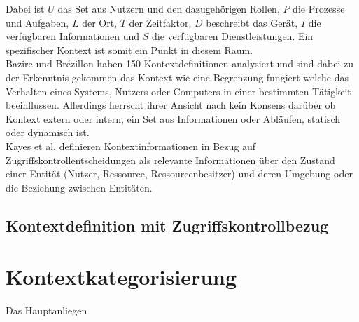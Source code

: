 Dabei ist $U$ das Set aus Nutzern und den dazugehörigen Rollen, $P$ die Prozesse und Aufgaben, $L$ der Ort, $T$ der Zeitfaktor, $D$ beschreibt das Gerät, $I$ die verfügbaren Informationen und $S$ die verfügbaren Dienstleistungen.
Ein spezifischer Kontext ist somit ein Punkt in diesem Raum.\\
Bazire und Brézillon \cite{hutchison_understanding_2005} haben 150 Kontextdefinitionen analysiert und sind dabei zu der Erkenntnis gekommen das Kontext wie eine Begrenzung fungiert welche das Verhalten eines Systems, Nutzers oder Computers in einer bestimmten Tätigkeit beeinflussen.
Allerdings herrscht ihrer Ansicht nach kein Konsens darüber ob Kontext extern oder intern, ein Set aus Informationen oder Abläufen, statisch oder dynamisch ist.\\

Kayes et al.\cite{kayes_icaf_2012} definieren Kontextinformationen in Bezug auf Zugriffskontrollentscheidungen als relevante Informationen über den Zustand einer Entität (Nutzer, Ressource, Ressourcenbesitzer) und deren Umgebung oder die Beziehung zwischen Entitäten.


\subsection{Kontextdefinition mit Zugriffskontrollbezug}
\section{Kontextkategorisierung}
Das Hauptanliegen 

